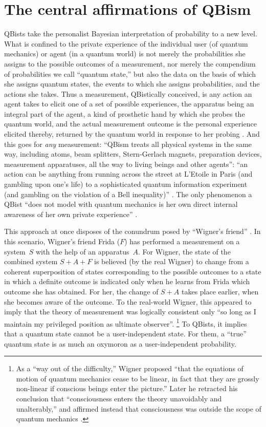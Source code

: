 \documentclass[12pt]{article}
\begin{document}
\section{The central affirmations of QBism}\label{sec.ca}
QBists take the personalist Bayesian interpretation of probability to a new level. What is confined to the private {experience} of the individual user (of quantum mechanics) or agent (in a quantum world) is not merely the probabilities she assigns to the possible outcomes of a measurement, nor merely the compendium of probabilities we call ``{quantum state},'' but also the data on the basis of which she assigns quantum states, the events to which she assigns probabilities, and the actions she takes. Thus a measurement, QBistically conceived, is any action an agent takes to elicit one of a set of possible experiences, the apparatus being an integral part of the agent, a kind of {prosthetic hand} by which she probes the quantum world, and the actual measurement outcome is the personal experience elicited thereby, returned by the quantum world in response to her probing \cite{FS2013}. And this goes for \emph{any} measurement: ``QBism treats all physical systems in the same way, including atoms, beam splitters, Stern-Gerlach magnets, preparation devices, measurement apparatuses, all the way to living beings and other agents''\cite{FS2015}: ``an action can be anything from running across the street at L'Etoile in Paris (and gambling upon one's life) to a sophisticated quantum information experiment (and gambling on the violation of a Bell inequality)'' \cite{Fuchs_Notwithstanding}. The only phenomenon a QBist ``does not model with quantum mechanics is her own direct internal awareness of her own private {experience}'' \cite{FMS2014}.

This approach at once disposes of the {conundrum} posed by ``{Wigner's friend}'' \cite{Wigner}. In this scenario, Wigner's friend Frida ($F$) has performed a measurement on a system~$S$ with the help of an apparatus~$A$. For Wigner, the state of the combined system $S+A+F$ is believed (by the real Wigner) to change from a coherent superposition of states corresponding to the possible outcomes to a state in which a definite outcome is indicated only when he learns from Frida which outcome she has obtained. For her, the change of $S+A$ takes place earlier, when {she} becomes aware of the outcome. To the real-world Wigner, this appeared to imply that the theory of measurement was logically consistent only ``so long as I maintain my privileged position as ultimate observer''.%
\footnote{As a ``way out of the difficulty,'' Wigner \cite{Wigner} proposed ``that the equations of motion of quantum mechanics cease to be linear, in fact that they are grossly non-linear if conscious beings enter the picture.'' Later he retracted his conclusion that ``consciousness enters the theory unavoidably and unalterably,'' and affirmed instead that consciousness was outside the scope of quantum mechanics \cite{Wigner1977}.}
To QBists, it implies that a quantum state cannot be a user-independent state. For them, a ``true'' quantum state is as much an oxymoron as a user-independent probability.
\end{document}
